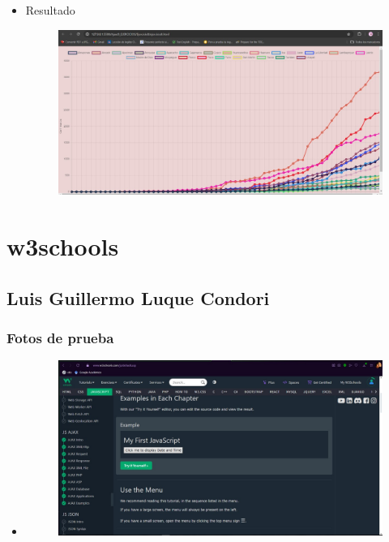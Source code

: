 \documentclass{article}
\begin{document}
\begin{itemize}
\begin{figure}[H]
		\end{figure}
		\item Resultado
		\begin{figure}[H]
			\centering
			\includegraphics[width=1.0\textwidth,keepaspectratio]{img/Ejer8T2Result.jpg}
		\end{figure}
	\end{itemize}


	\section{w3schools}

	\subsection{Luis Guillermo Luque Condori}
	\subsubsection{Fotos de prueba}
	\begin{itemize}
		\item \begin{figure}[H]
			\centering
			\includegraphics[width=1.0\textwidth,keepaspectratio]{img/wsLuis.jpg}
		\end{figure}
	\end{itemize}
	
\end{document}

